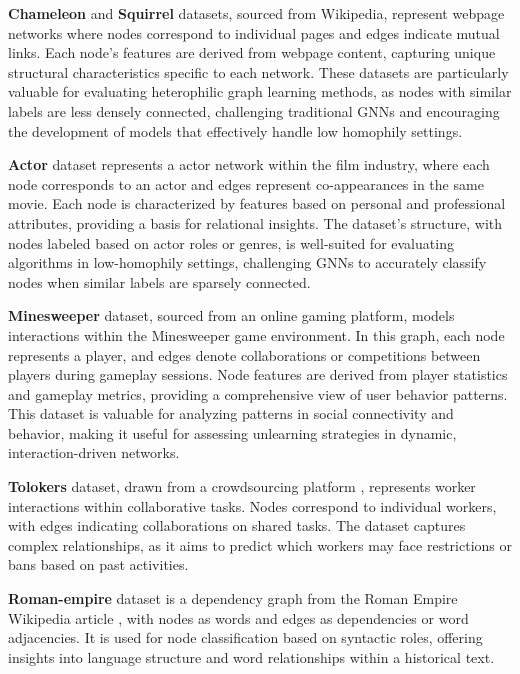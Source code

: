\textbf{Chameleon} and \textbf{Squirrel} \cite{pei2020geomgcn} datasets, sourced from Wikipedia, represent webpage networks where nodes correspond to individual pages and edges indicate mutual links. Each node’s features are derived from webpage content, capturing unique structural characteristics specific to each network. These datasets are particularly valuable for evaluating heterophilic graph learning methods, as nodes with similar labels are less densely connected, challenging traditional GNNs and encouraging the development of models that effectively handle low homophily settings.

\textbf{Actor} \cite{pei2020geomgcn} dataset represents a actor network within the film industry, where each node corresponds to an actor and edges represent co-appearances in the same movie. Each node is characterized by features based on personal and professional attributes, providing a basis for relational insights. The dataset’s structure, with nodes labeled based on actor roles or genres, is well-suited for evaluating algorithms in low-homophily settings, challenging GNNs to accurately classify nodes when similar labels are sparsely connected.

\textbf{Minesweeper} \cite{platonov2023hete_gnn_survey4} dataset, sourced from an online gaming platform, models interactions within the Minesweeper game environment. In this graph, each node represents a player, and edges denote collaborations or competitions between players during gameplay sessions. Node features are derived from player statistics and gameplay metrics, providing a comprehensive view of user behavior patterns. This dataset is valuable for analyzing patterns in social connectivity and behavior, making it useful for assessing unlearning strategies in dynamic, interaction-driven networks.

\textbf{Tolokers} \cite{platonov2023hete_gnn_survey4} dataset, drawn from a crowdsourcing platform \cite{Tolokers_original}, represents worker interactions within collaborative tasks. Nodes correspond to individual workers, with edges indicating collaborations on shared tasks. The dataset captures complex relationships, as it aims to predict which workers may face restrictions or bans based on past activities.

\textbf{Roman-empire} \cite{platonov2023hete_gnn_survey4} dataset is a dependency graph from the Roman Empire Wikipedia article \cite{lhoest2021empire_original}, with nodes as words and edges as dependencies or word adjacencies. It is used for node classification based on syntactic roles, offering insights into language structure and word relationships within a historical text.

